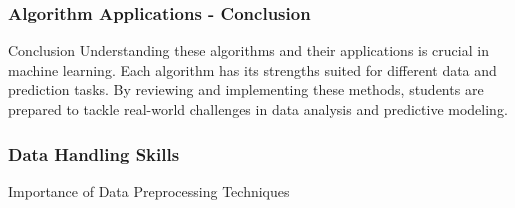 \documentclass[aspectratio=169]{beamer}
\begin{document}
\begin{frame}[fragile]
    \frametitle{Algorithm Applications - Conclusion}
    \begin{block}{Conclusion}
        Understanding these algorithms and their applications is crucial in machine learning. Each algorithm has its strengths suited for different data and prediction tasks. By reviewing and implementing these methods, students are prepared to tackle real-world challenges in data analysis and predictive modeling.
    \end{block}
\end{frame}

\begin{frame}[fragile]
    \frametitle{Data Handling Skills}
    \begin{block}{Importance of Data Preprocessing Techniques}
        \end{block}
\end{frame}
\end{document}
